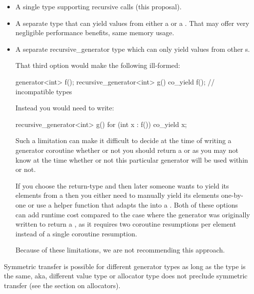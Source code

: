 \documentclass{wg21}
\begin{document}
\begin{itemize}
    \item A single  type supporting recursive calls (this proposal).

    \item A separate type  that can yield values from either a  or a . That may offer very negligible performance benefits, same memory usage.

    \item A separate {recursive_generator} type which can only yield values from other s.

    That third option would make the following ill-formed:

    \begin{colorblock}
        generator<int> f();
        recursive_generator<int> g() {
            co_yield f(); // incompatible types
        }
    \end{colorblock}

    Instead you would need to write:
    \begin{colorblock}
        recursive_generator<int> g() {
            for (int x : f()) co_yield x;
        }
    \end{colorblock}

    Such a limitation can make it difficult to decide at the time of writing a generator
    coroutine whether or not you should return a  or 
    as you may not know at the time whether or not this particular generator will be used
    within  or not.

    If you choose the  return-type and then later someone wants to yield its
    elements from a  then you either need to manually yield its
    elements one-by-one or use a helper function that adapts the  into a
    . Both of these options can add runtime cost compared to the case where the generator was originally written to return a ,
    as it requires two coroutine resumptions per element instead of a single coroutine resumption.

    Because of these limitations, we are not recommending this approach.
\end{itemize}

Symmetric transfer is possible for different generator types as long as the  type is the same, aka,
different value type or allocator type does not preclude symmetric transfer (see the section on allocators).
\end{document}
